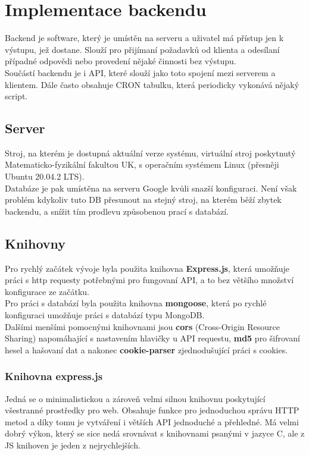 \chapter{Implementace backendu}
Backend je software, který je umístěn na serveru a uživatel má přístup jen
k výstupu, jež dostane. Slouží pro přijímaní požadavků od klienta a odesílaní
případné odpovědi nebo provedení nějaké činnosti bez výstupu.
\\
Součástí backendu je i API, které slouží jako toto spojení mezi serverem a
klientem. Dále často obsahuje CRON tabulku, která periodicky vykonává nějaký
script.

\section{Server}
Stroj, na kterém je dostupná aktuální verze systému, virtuální stroj poskytnutý
Matematicko-fyzikální fakultou UK, s operačním systémem Linux (přesněji Ubuntu
20.04.2 LTS).
\\
Databáze je pak umístěna na serveru Google kvůli snazší konfiguraci. Není však
problém kdykoliv tuto DB přesunout na stejný stroj, na kterém běží zbytek
backendu, a snížit tím prodlevu způsobenou prací s databází.


\section{Knihovny}
Pro rychlý začátek vývoje byla použita knihovna \textbf{Express.js}, která
umožňuje práci s http requesty potřebnými pro fungovaní API, a to 
bez většího množství konfigurace ze začátku.
\\
Pro práci s databází byla použita knihovna \textbf{mongoose}, která po rychlé konfiguraci
umožňuje práci s databází typu MongoDB.
\\
Dalšími menšími pomocnými knihovnami jsou
\textbf{cors} (Cross-Origin Resource Sharing) napomáhající s nastavením hlavičky u API requestu,
\textbf{md5} pro šifrovaní hesel a hašovaní dat a nakonec
\textbf{cookie-parser} zjednodušující práci s cookies.

\subsection{Knihovna express.js}
Jedná se o minimalistickou a zároveň velmi silnou knihovnu poskytující
všestranné prostředky pro web. Obsahuje funkce pro jednoduchou správu HTTP metod
a díky tomu je vytváření i větších API jednoduché a přehledné. Má velmi dobrý
výkon, který se sice nedá srovnávat s knihovnami psanými v jazyce C, ale z JS
knihoven je jeden z nejrychlejších.

